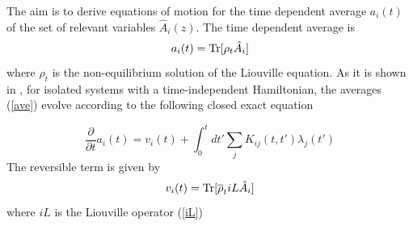 \documentclass[a4paper,openright,12pt]{book}
\begin{document}
The  aim is  to
derive equations of motion for  the time dependent average $a_i(t)$ of
the set of relevant variables $\hat{A}_i(z)$. The time dependent average
is
\begin{equation}
  a_i(t)={\rm Tr}[\rho_t\hat{A}_i]
  \label{ave}
\end{equation}
where $\rho_t$ is
the non-equilibrium solution of the Liouville equation. As it is shown
in  \cite{Grabert1982},  for  isolated systems  with a time-independent
Hamiltonian,  the   averages  (\ref{ave})  evolve  according   to  the
following closed exact equation

\begin{equation}
\frac{\partial }{\partial t} a_i(t)
= v_i(t) + \int_0^t dt' \sum_j K_{ij}(t,t') \lambda_j(t')
\label{ex}
\end{equation}
The reversible term is given by
\begin{equation}
v_i(t) = {\rm Tr}[\overline{\rho}_t  iL \hat{A}_i]
\label{vit}
\end{equation}
where $iL$ is the Liouville operator (\ref{iL})
\end{document}
